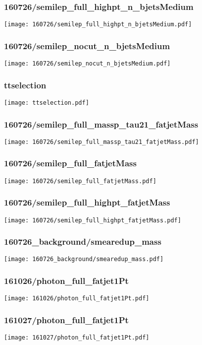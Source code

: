 \begin{frame}
   \frametitle{\small 160726/semilep\_full\_highpt\_n\_bjetsMedium}
   \centering
   \texttt{[image: 160726/semilep\_full\_highpt\_n\_bjetsMedium.pdf]}
\end{frame}

\begin{frame}
   \frametitle{\small 160726/semilep\_nocut\_n\_bjetsMedium}
   \centering
   \texttt{[image: 160726/semilep\_nocut\_n\_bjetsMedium.pdf]}
\end{frame}

\begin{frame}
   \frametitle{\small ttselection}
   \centering
   \texttt{[image: ttselection.pdf]}
\end{frame}

\begin{frame}
   \frametitle{\small 160726/semilep\_full\_massp\_tau21\_fatjetMass}
   \centering
   \texttt{[image: 160726/semilep\_full\_massp\_tau21\_fatjetMass.pdf]}
\end{frame}

\begin{frame}
   \frametitle{\small 160726/semilep\_full\_fatjetMass}
   \centering
   \texttt{[image: 160726/semilep\_full\_fatjetMass.pdf]}
\end{frame}

\begin{frame}
   \frametitle{\small 160726/semilep\_full\_highpt\_fatjetMass}
   \centering
   \texttt{[image: 160726/semilep\_full\_highpt\_fatjetMass.pdf]}
\end{frame}

\begin{frame}
   \frametitle{\small 160726\_background/smearedup\_mass}
   \centering
   \texttt{[image: 160726\_background/smearedup\_mass.pdf]}
\end{frame}

\begin{frame}
   \frametitle{\small 161026/photon\_full\_fatjet1Pt}
   \centering
   \texttt{[image: 161026/photon\_full\_fatjet1Pt.pdf]}
\end{frame}

\begin{frame}
   \frametitle{\small 161027/photon\_full\_fatjet1Pt}
   \centering
   \texttt{[image: 161027/photon\_full\_fatjet1Pt.pdf]}
\end{frame}

